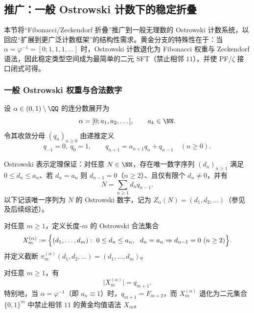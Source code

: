 \subsection{推广：一般 Ostrowski 计数下的稳定折叠}\label{subsec:ostrowski-generalized-fold}

本节将“Fibonacci/Zeckendorf 折叠”推广到一般无理数的 Ostrowski 计数系统，以回应“扩展到更广泛计数框架”的结构性需求。黄金分支的特殊性在于：当 $\alpha=\varphi^{-1}=[0;1,1,1,\dots]$ 时，Ostrowski 计数退化为 Fibonacci 权重与 Zeckendorf 语法，因此稳定类型空间成为最简单的二元 SFT（禁止相邻 $11$），并使 PF/$\zeta$ 接口闭式可得。

\subsubsection{一般 Ostrowski 权重与合法数字}

设 $\alpha\in(0,1)\setminus\QQ$ 的连分数展开为
\[
\alpha=[0;a_1,a_2,\dots],\qquad a_k\in\NN.
\]
令其收敛分母 $(q_n)_{n\ge 0}$ 由递推定义
\[
q_{-1}=0,\ q_0=1,\qquad q_{n+1}=a_{n+1}q_n+q_{n-1}\quad(n\ge 0).
\]

Ostrowski 表示定理保证：对任意 $N\in\NN$，存在唯一数字序列 $(d_n)_{n\ge 1}$ 满足
\(0\le d_n\le a_n\)、若 $d_n=a_n$ 则 $d_{n-1}=0$（$n\ge 2$）、且仅有限个 $d_n\neq 0$，并有
\[
N=\sum_{n\ge 1} d_n q_{n-1}.
\]
以下记该唯一序列为 $N$ 的 Ostrowski 数字，记为 $Z_\alpha(N)=(d_1,d_2,\dots)$（参见 \cite{Ostrowski1922} 及后续综述）。

\begin{definition}[一般稳定类型空间]\label{def:Xm-alpha}
对任意 $m\ge 1$，定义长度-$m$ 的 Ostrowski 合法集合
\[
X_m^{(\alpha)}:=\Bigl\{(d_1,\dots,d_m):\ 0\le d_n\le a_n,\ \ d_n=a_n\Rightarrow d_{n-1}=0\ (n\ge 2)\Bigr\}.
\]
并定义截断 $\pi_m^{(\alpha)}(d_1,d_2,\dots)=(d_1,\dots,d_m)$。
\end{definition}

\begin{proposition}\label{prop:Xm-alpha-cardinality}
对任意 $m\ge 1$，有
\[
\bigl|X_m^{(\alpha)}\bigr|=q_{m+1}.
\]
特别地，当 $\alpha=\varphi^{-1}$（即 $a_n\equiv 1$）时，$q_{m+1}=F_{m+2}$，而 $X_m^{(\alpha)}$ 退化为二元集合 $\{0,1\}^m$ 中禁止相邻 $11$ 的黄金均值语法 $X_m$。
\end{proposition}

